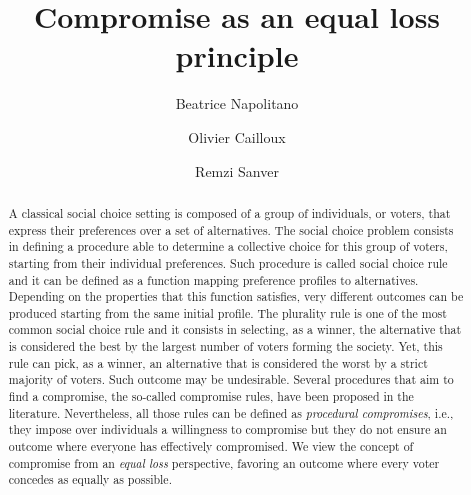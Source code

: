 \documentclass[version=3.21, pagesize, twoside=off, bibliography=totoc, DIV=calc, fontsize=12pt, a4paper]{scrartcl}
\title{Compromise as an equal loss principle}
\author{Beatrice Napolitano}
\author{Olivier Cailloux}
\author{Remzi Sanver}
\affil{Université Paris-Dauphine, PSL Research University, CNRS, LAMSADE, 75016 PARIS, FRANCE\\
	\href{mailto:@dauphine.fr}{@dauphine.fr}
}
\begin{document}
\maketitle

\begin{abstract}
	A classical social choice setting is composed of a group of individuals, or voters, that express their preferences over a set of alternatives. The social choice problem consists in defining a procedure able to determine a collective choice for this group of voters, starting from their individual preferences. Such procedure is called social choice rule and it can be defined as a function mapping preference profiles to alternatives. Depending on the properties that this function satisfies, very different outcomes can be produced starting from the same initial profile. The plurality rule is one of the most common social choice rule and it consists in selecting, as a winner, the alternative that is considered the best by the largest number of voters forming the society. Yet, this rule can pick, as a winner, an alternative that is considered the worst by a strict majority of voters. Such outcome may be undesirable. Several procedures that aim to find a compromise, the so-called compromise rules, have been proposed in the literature. Nevertheless, all those rules can be defined as \emph{procedural compromises}, i.e., they impose over individuals a willingness to compromise but they do not ensure an outcome where everyone has effectively compromised. We view the concept of compromise from an \emph{equal loss} perspective, favoring an outcome where every voter concedes as equally as possible.
\end{abstract}
\end{document}
